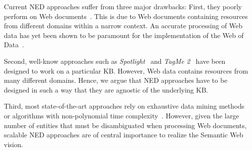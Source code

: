 Current \ac{NED} approaches suffer from three major drawbacks:
First, they poorly perform on Web documents~\cite{RatinovRo09}.
This is due to Web documents containing resources from different domains within a narrow context.
An accurate processing of Web data has yet been shown to be paramount for the implementation of the Web of Data~\cite{GER+13}.

Second, well-know approaches such as \emph{Spotlight}~\cite{spotlight} and \emph{TagMe 2}~\cite{TagMe2} have been designed to work on a particular \ac{KB}.
However, Web data contains resources from many different domains.
Hence, we argue that \ac{NED} approaches have to be designed in such a way that they are agnostic of the underlying \ac{KB}.

Third, most state-of-the-art approaches rely on exhaustive data mining methods~\cite{Cucerzan07,rat:rot} or algorithms with non-polynomial time complexity~\cite{Kleb11WIMS}.
However, given the large number of entities that must be disambiguated when processing Web documents, scalable \ac{NED} approaches are of central importance to realize the Semantic Web vision.


